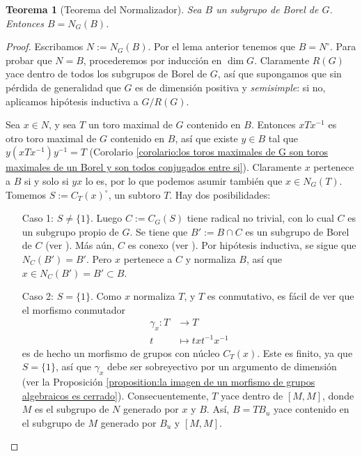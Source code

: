 \documentclass[spanish,10pt]{amsart}
\newtheorem{theorem}{Teorema}[section]
\theoremstyle{definition}
\theoremstyle{remark}
\numberwithin{equation}{section}
\begin{document}
\begin{theorem}[Teorema del Normalizador]\label{teorema:teorema del normalizador}
Sea $B$ un subgrupo de Borel de $G$. Entonces $B = N_G (B)$.
\end{theorem}
\begin{proof}
Escribamos $N := N_G (B)$. Por el lema anterior tenemos que $B = N^\circ$. Para probar que $N = B$, procederemos por inducción en $\dim G$. Claramente $R(G)$ yace dentro de todos los subgrupos de Borel de $G$, así que supongamos que sin pérdida de generalidad que $G$ es de dimensión positiva y \textit{semisimple}: si no, aplicamos hipótesis inductiva a $G/R(G)$.

Sea $x \in N$, y sea $T$ un toro maximal de $G$ contenido en $B$. Entonces $x T x^{-1}$ es otro toro maximal de $G$ contenido en $B$, así que existe $y \in B$ tal que $y( x T x^{-1})y^{-1} = T$ (Corolario \ref{corolario:los toros maximales de G son toros maximales de un Borel y son todos conjugados entre si}). Claramente $x $ pertenece a $B$ si y solo si $yx$ lo es, por lo que podemos asumir también que $x \in N_G (T)$. Tomemos $S := C_T (x)^\circ$, un subtoro $T$. Hay dos posibilidades:
\begin{enumerate}
\item[Caso 1:] $S \neq \{1\}$. Luego $C := C_G (S)$ tiene radical no trivial, con lo cual $C$ es un subgrupo propio de $G$. Se tiene que $B' := B \cap C$ es un subgrupo de Borel de $C$ (ver \cite[\S 22.4]{humphreys2012linearAlgebraicGroups}). Más aún, $C$ es conexo (ver \cite[Teorema 22.3]{humphreys2012linearAlgebraicGroups}). Por hipótesis inductiva, se sigue que $N_C (B') = B'$. Pero $x$ pertenece a $C$ y normaliza $B$, así que $x \in N_C (B') = B' \subset B$.
\item[Caso 2:] $S = \{1\}$. Como $x$ normaliza $T$, y $T$ es conmutativo, es fácil de ver que el morfismo conmutador
\begin{align*}
\gamma_x : T &\longrightarrow T \\
t &\longmapsto t x t^{-1}x^{-1}
\end{align*}
es de hecho un morfismo de grupos con núcleo $C_T (x)$. Este es finito, ya que $S = \{1\}$, así que $\gamma_x$ debe ser sobreyectivo por un argumento de dimensión (ver la Proposición \ref{proposition:la imagen de un morfismo de grupos algebraicos es cerrado}). Consecuentemente, $T$ yace dentro de $[M, M]$, donde $M$ es el subgrupo de $N$ generado por $x$ y $B$. Así, $B = T B_u$ yace contenido en el subgrupo de $M$ generado por $B_u$ y $[M,M]$.


\end{enumerate}
\end{proof}
\end{document}
